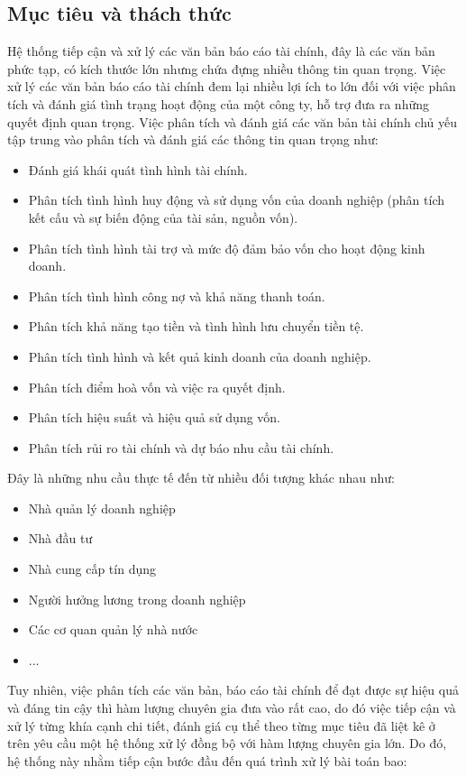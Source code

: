 \documentclass[14pt]{extreport}
\begin{document}
\subsection{Mục tiêu và thách thức}
Hệ thống tiếp cận và xử lý các văn bản báo cáo tài chính, đây là các văn bản phức tạp, có kích thước lớn nhưng chứa đựng nhiều thông tin quan trọng. Việc xử lý các văn bản báo cáo tài chính đem lại nhiều lợi ích to lớn đối với việc phân tích và đánh giá tình trạng hoạt động của một công ty, hỗ trợ đưa ra những quyết định quan trọng. Việc phân tích và đánh giá các văn bản tài chính chủ yếu tập trung vào phân tích và đánh giá các thông tin quan trọng như:
\begin{itemize}
    \item Đánh giá khái quát tình hình tài chính.
    \item Phân tích tình hình huy động và sử dụng vốn của doanh nghiệp (phân tích kết cấu và sự biến động của tài sản, nguồn vốn).
    \item Phân tích tình hình tài trợ và mức độ đảm bảo vốn cho hoạt động kinh doanh. 
    \item Phân tích tình hình công nợ và khả năng thanh toán.
    \item Phân tích khả năng tạo tiền và tình hình lưu chuyển tiền tệ.
    \item Phân tích tình hình và kết quả kinh doanh của doanh nghiệp.
    \item Phân tích điểm hoà vốn và việc ra quyết định.
    \item Phân tích hiệu suất và hiệu quả sử dụng vốn.
    \item Phân tích rủi ro tài chính và dự báo nhu cầu tài chính.
\end{itemize}
Đây là những nhu cầu thực tế đến từ nhiều đối tượng khác nhau như:
\begin{itemize}
    \item Nhà quản lý doanh nghiệp
    \item Nhà đầu tư
    \item Nhà cung cấp tín dụng
    \item Người hưởng lương trong doanh nghiệp
    \item Các cơ quan quản lý nhà nước
    \item ...
\end{itemize}
Tuy nhiên, việc phân tích các văn bản, báo cáo tài chính để đạt được sự hiệu quả và đáng tin cậy thì hàm lượng chuyên gia đưa vào rất cao, do đó việc tiếp cận và xử lý từng khía cạnh chi tiết, đánh giá cụ thể theo từng mục tiêu đã liệt kê ở trên yêu cầu một hệ thống xử lý đồng bộ với hàm lượng chuyên gia lớn. Do đó, hệ thống này  nhằm tiếp cận bước đầu đến quá trình xử lý bài toán bao:
\end{document}
